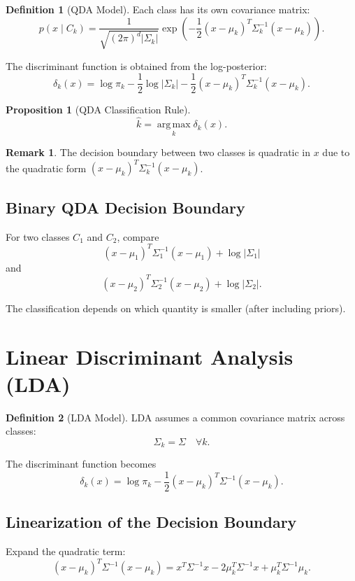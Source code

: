 \documentclass[12pt,oneside]{book}
\numberwithin{equation}{section}
\theoremstyle{definition}
\newtheorem{definition}{Definition}[section]
\newtheorem{remark}{Remark}[section]
\theoremstyle{plain}
\newtheorem{proposition}{Proposition}[section]
\theoremstyle{remark}
\newcommand{\argmax}{\operatorname*{arg\,max}}
\begin{document}
\begin{definition}[QDA Model]
Each class has its own covariance matrix:
\[
p(x \mid C_k)
=
\frac{1}{\sqrt{(2\pi)^d|\Sigma_k|}}
\exp\left(
-\frac{1}{2}(x-\mu_k)^T\Sigma_k^{-1}(x-\mu_k)
\right).
\]
\end{definition}

The discriminant function is obtained from the log-posterior:
\[
\delta_k(x)
=
\log \pi_k
-
\frac{1}{2}\log|\Sigma_k|
-
\frac{1}{2}(x-\mu_k)^T\Sigma_k^{-1}(x-\mu_k).
\]

\begin{proposition}[QDA Classification Rule]
\[
\hat{k}
=
\argmax_k \delta_k(x).
\]
\end{proposition}

\begin{remark}
The decision boundary between two classes is quadratic in $x$ due to the quadratic form $(x-\mu_k)^T\Sigma_k^{-1}(x-\mu_k)$.
\end{remark}

\subsection{Binary QDA Decision Boundary}

For two classes $C_1$ and $C_2$, compare
\[
(x-\mu_1)^T\Sigma_1^{-1}(x-\mu_1)+\log|\Sigma_1|
\]
and
\[
(x-\mu_2)^T\Sigma_2^{-1}(x-\mu_2)+\log|\Sigma_2|.
\]

The classification depends on which quantity is smaller (after including priors).

\section{Linear Discriminant Analysis (LDA)}

\begin{definition}[LDA Model]
LDA assumes a common covariance matrix across classes:
\[
\Sigma_k=\Sigma
\quad \forall k.
\]
\end{definition}

The discriminant function becomes
\[
\delta_k(x)
=
\log \pi_k
-
\frac{1}{2}(x-\mu_k)^T\Sigma^{-1}(x-\mu_k).
\]

\subsection{Linearization of the Decision Boundary}

Expand the quadratic term:
\[
(x-\mu_k)^T\Sigma^{-1}(x-\mu_k)
=
x^T\Sigma^{-1}x
-
2\mu_k^T\Sigma^{-1}x
+
\mu_k^T\Sigma^{-1}\mu_k.
\]
\end{document}
